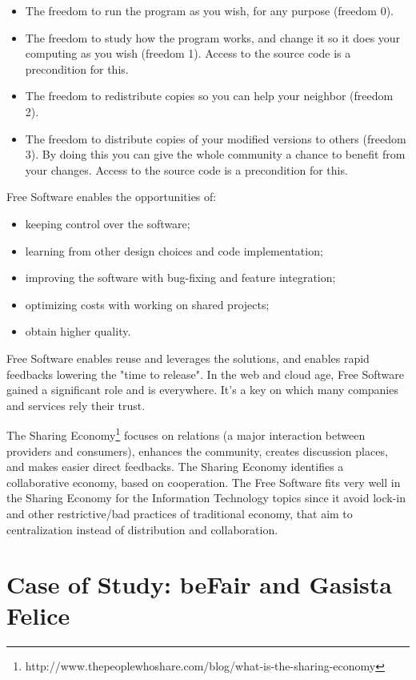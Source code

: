 \begin{itemize}
\item The freedom to run the program as you wish, for any purpose (freedom 0).
\item The freedom to study how the program works, and change it so it does your computing as you wish (freedom 1). Access to the source code is a precondition for this.
\item The freedom to redistribute copies so you can help your neighbor (freedom 2).
\item The freedom to distribute copies of your modified versions to others (freedom 3). By doing this you can give the whole community a chance to benefit from your changes. Access to the source code is a precondition for this.
\end{itemize}

Free Software enables the opportunities of:

\begin{itemize}
\item keeping control over the software;
\item learning from other design choices and code implementation;
\item improving the software with bug-fixing and feature integration;
\item optimizing costs with working on shared projects;
\item obtain higher quality.
\end{itemize}

Free Software enables reuse and leverages the solutions, and enables rapid feedbacks lowering the "time to release". In the web and cloud age, Free Software gained a significant role and is everywhere. It's a key on which many companies and services rely their trust.

The Sharing Economy\footnote{http://www.thepeoplewhoshare.com/blog/what-is-the-sharing-economy} focuses on relations (a major interaction between providers and consumers), enhances the community, creates discussion places, and makes easier direct feedbacks. The Sharing Economy identifies a collaborative economy, based on cooperation. The Free Software fits very well in the Sharing Economy for the Information
Technology topics since it avoid lock-in and other restrictive/bad practices of traditional economy, that aim to centralization instead of distribution and collaboration.

\section{Case of Study: beFair and Gasista
Felice}\label{case-of-study-befair-and-gasista-felice}

